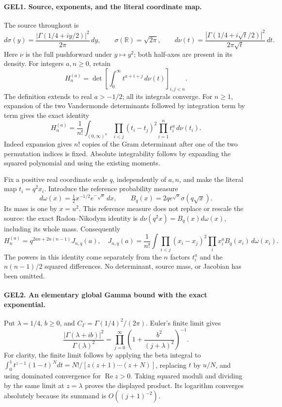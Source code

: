 \documentclass[11pt,a4paper]{article}
\begin{document}
\paragraph{GEL1. Source, exponents, and the literal coordinate map.}
The source throughout is
\[
 d\sigma(y)=\frac{|\Gamma(1/4+iy/2)|^2}{2\pi}\,dy,
 \qquad \sigma(\mathbb R)=\sqrt{2\pi},\qquad
 d\nu(t)=\frac{|\Gamma(1/4+i\sqrt t/2)|^2}{2\pi\sqrt t}\,dt.
 \tag{GEL1}
\]
Here \(\nu\) is the full pushforward under \(y\mapsto y^2\); both
half-axes are present in its density. For integers \(a,n\geq0\), retain
\[
 H_n^{(a)}=\det\left[\int_0^\infty t^{a+i+j}\,d\nu(t)\right]_{i,j<n}.
\]
The definition extends to real \(a>-1/2\); all its integrals converge.
For \(n\geq1\), expansion of the two Vandermonde determinants followed
by integration term by term gives the exact identity
\[
 H_n^{(a)}=\frac1{n!}\int_{(0,\infty)^n}
       \prod_{i<j}(t_i-t_j)^2\prod_{i=1}^n t_i^a\,d\nu(t_i).
 \tag{GEL2}
\]
Indeed expansion gives \(n!\) copies of the Gram determinant after one
of the two permutation indices is fixed. Absolute integrability follows
by expanding the squared polynomial and using the existing moments.

Fix a positive real coordinate scale \(q\), independently of \(a,n\),
and make the literal map \(t_i=q^2x_i\). Introduce the reference
probability measure
\[
 d\omega(x)=\tfrac12x^{-1/2}e^{-\sqrt x}\,dx,
 \qquad B_q(x)=2q e^{\sqrt x}\sigma(q\sqrt x).
\]
Its mass is one by \(x=u^2\). This reference measure does not replace
or rescale the source: the exact Radon--Nikodym identity is
\(d\nu(q^2x)=B_q(x)d\omega(x)\), including its whole mass. Consequently
\[
 \boxed{H_n^{(a)}=q^{2an+2n(n-1)}J_{n,q}(a),\quad
 J_{n,q}(a)=\frac1{n!}\int\prod_{i<j}(x_i-x_j)^2
                         \prod_i x_i^aB_q(x_i)\,d\omega(x_i).}
 \tag{GEL3}
\]
The powers in this identity come separately from the \(n\) factors
\(t_i^a\) and the \(n(n-1)/2\) squared differences. No determinant,
source mass, or Jacobian has been omitted.

\paragraph{GEL2. An elementary global Gamma bound with the exact exponential.}
Put \(\lambda=1/4\), \(b\geq0\), and
\(C_\Gamma=\Gamma(1/4)^2/(2\pi)\). Euler's finite limit gives
\[
 \frac{|\Gamma(\lambda+ib)|^2}{\Gamma(\lambda)^2}
 =\prod_{j=0}^\infty\left(1+\frac{b^2}{(j+\lambda)^2}\right)^{-1}.
\]
For clarity, the finite limit follows by applying the beta integral to
\(\int_0^1t^{z-1}(1-t)^Ndt=N!/[z(z+1)\cdots(z+N)]\), replacing
\(t\) by \(u/N\), and using dominated convergence for
\(\operatorname{Re}z>0\). Taking squared moduli and dividing by the
same limit at \(z=\lambda\) proves the displayed product. Its logarithm
converges absolutely because its summand is \(O((j+1)^{-2})\).
\end{document}
